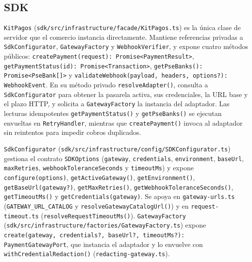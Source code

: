 \subsection{SDK}
\begin{sloppypar}\texttt{KitPagos} (\texttt{sdk/src/infrastructure/facade/KitPagos.ts}) es la única clase de servidor que el comercio instancia directamente. Mantiene referencias privadas a \texttt{SdkConfigurator}, \texttt{GatewayFactory} y \texttt{WebhookVerifier}, y expone cuatro métodos públicos: \texttt{createPayment(request): Promise<PaymentResult>}, \texttt{getPaymentStatus(id): Promise<Transaction>}, \texttt{getPseBanks(): Promise<PseBank[]>} y \texttt{validateWebhook(payload, headers, options?): WebhookEvent}. En su método privado \texttt{resolveAdapter()}, consulta a \texttt{SdkConfigurator} para obtener la pasarela activa, sus credenciales, la URL base y el plazo HTTP, y solicita a \texttt{GatewayFactory} la instancia del adaptador. Las lecturas idempotentes \texttt{getPaymentStatus()} y \texttt{getPseBanks()} se ejecutan envueltas en \texttt{RetryHandler}, mientras que \texttt{createPayment()} invoca al adaptador sin reintentos para impedir cobros duplicados.\end{sloppypar}

\begin{sloppypar}\texttt{Sdk\allowbreak{}Configurator} (\texttt{sdk/\allowbreak{}src/\allowbreak{}infrastructure/\allowbreak{}config/\allowbreak{}SDKConfigurator.ts}) gestiona el contrato \texttt{SDKOptions} (\texttt{gateway}, \texttt{credentials}, \texttt{environment}, \texttt{baseUrl}, \texttt{maxRetries}, \texttt{webhook\allowbreak{}Tolerance\allowbreak{}Seconds} y \texttt{timeoutMs}) y expone \texttt{configure(\allowbreak{}options)}, \texttt{get\allowbreak{}Active\allowbreak{}Gateway()}, \texttt{getEnvironment()}, \texttt{getBaseUrl(\allowbreak{}gateway?)}, \texttt{getMaxRetries()}, \texttt{get\allowbreak{}Webhook\allowbreak{}Tolerance\allowbreak{}Seconds()}, \texttt{getTimeoutMs()} y \texttt{getCredentials(\allowbreak{}gateway)}. Se apoya en \texttt{gateway-\allowbreak{}urls.ts} (\texttt{GATEWAY\_\allowbreak{}URL\_\allowbreak{}CATALOG} y \texttt{resolve\allowbreak{}Gateway\allowbreak{}Catalog\allowbreak{}Url()}) y en \texttt{request-\allowbreak{}timeout.ts} (\texttt{resolve\allowbreak{}Request\allowbreak{}Timeout\allowbreak{}Ms()}). \texttt{GatewayFactory} (\texttt{sdk/\allowbreak{}src/\allowbreak{}infrastructure/\allowbreak{}factories/\allowbreak{}GatewayFactory.ts}) expone \texttt{create(\allowbreak{}gateway, credentials?, baseUrl?, timeoutMs?): Payment\allowbreak{}Gateway\allowbreak{}Port}, que instancia el adaptador y lo envuelve con \texttt{with\allowbreak{}Credential\allowbreak{}Redaction()} (\texttt{redacting-\allowbreak{}gateway.ts}).\end{sloppypar}

